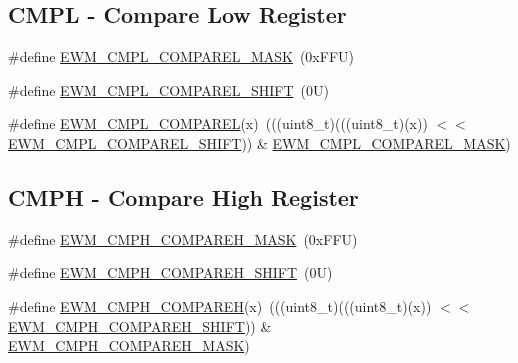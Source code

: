\subsection*{C\+M\+PL -\/ Compare Low Register}
\begin{DoxyCompactItemize}
\item 
\#define \mbox{\hyperlink{group___e_w_m___register___masks_gaed4764277fd6da7338abe074b6ca509e}{E\+W\+M\+\_\+\+C\+M\+P\+L\+\_\+\+C\+O\+M\+P\+A\+R\+E\+L\+\_\+\+M\+A\+SK}}~(0x\+F\+F\+U)
\item 
\#define \mbox{\hyperlink{group___e_w_m___register___masks_ga34ba2acd3dfb6ac825d6ca812b4461fd}{E\+W\+M\+\_\+\+C\+M\+P\+L\+\_\+\+C\+O\+M\+P\+A\+R\+E\+L\+\_\+\+S\+H\+I\+FT}}~(0\+U)
\item 
\#define \mbox{\hyperlink{group___e_w_m___register___masks_gab21f922dd31c0389d2431b0bad15c34a}{E\+W\+M\+\_\+\+C\+M\+P\+L\+\_\+\+C\+O\+M\+P\+A\+R\+EL}}(x)~(((uint8\+\_\+t)(((uint8\+\_\+t)(x)) $<$$<$ \mbox{\hyperlink{group___e_w_m___register___masks_ga34ba2acd3dfb6ac825d6ca812b4461fd}{E\+W\+M\+\_\+\+C\+M\+P\+L\+\_\+\+C\+O\+M\+P\+A\+R\+E\+L\+\_\+\+S\+H\+I\+FT}})) \& \mbox{\hyperlink{group___e_w_m___register___masks_gaed4764277fd6da7338abe074b6ca509e}{E\+W\+M\+\_\+\+C\+M\+P\+L\+\_\+\+C\+O\+M\+P\+A\+R\+E\+L\+\_\+\+M\+A\+SK}})
\end{DoxyCompactItemize}
\subsection*{C\+M\+PH -\/ Compare High Register}
\begin{DoxyCompactItemize}
\item 
\#define \mbox{\hyperlink{group___e_w_m___register___masks_ga2bba159a8c0eaace911da192c1747c73}{E\+W\+M\+\_\+\+C\+M\+P\+H\+\_\+\+C\+O\+M\+P\+A\+R\+E\+H\+\_\+\+M\+A\+SK}}~(0x\+F\+F\+U)
\item 
\#define \mbox{\hyperlink{group___e_w_m___register___masks_ga02d5e37ee2e38be4d3654c4eb0854cb5}{E\+W\+M\+\_\+\+C\+M\+P\+H\+\_\+\+C\+O\+M\+P\+A\+R\+E\+H\+\_\+\+S\+H\+I\+FT}}~(0\+U)
\item 
\#define \mbox{\hyperlink{group___e_w_m___register___masks_gae012c25873f36888e3d0302060c97be5}{E\+W\+M\+\_\+\+C\+M\+P\+H\+\_\+\+C\+O\+M\+P\+A\+R\+EH}}(x)~(((uint8\+\_\+t)(((uint8\+\_\+t)(x)) $<$$<$ \mbox{\hyperlink{group___e_w_m___register___masks_ga02d5e37ee2e38be4d3654c4eb0854cb5}{E\+W\+M\+\_\+\+C\+M\+P\+H\+\_\+\+C\+O\+M\+P\+A\+R\+E\+H\+\_\+\+S\+H\+I\+FT}})) \& \mbox{\hyperlink{group___e_w_m___register___masks_ga2bba159a8c0eaace911da192c1747c73}{E\+W\+M\+\_\+\+C\+M\+P\+H\+\_\+\+C\+O\+M\+P\+A\+R\+E\+H\+\_\+\+M\+A\+SK}})
\end{DoxyCompactItemize}


